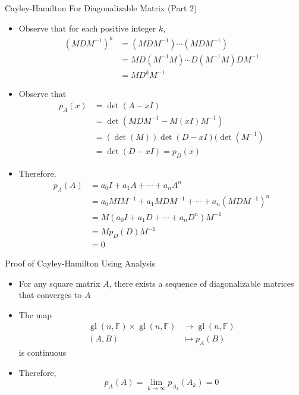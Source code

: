 \documentclass[usenames,dvipsnames,10pt]{beamer}
\newcommand\F{\mathbb{F}}
\newcommand{\gl}{\operatorname{gl}}
\begin{document}
\begin{frame}
  {Cayley-Hamilton For Diagonalizable Matrix (Part 2)}

  \begin{itemize}
  \item Observe that for each positive integer $k$,
    \begin{align*}
      (MDM^{-1})^k &= (MDM^{-1})\cdots (MDM^{-1})\\
                   &= MD(M^{-1}M)\cdots D(M^{-1}M)DM^{-1}\\
                   &= MD^kM^{-1}
    \end{align*}
  \item Observe that
    \begin{align*}
      p_A(x) &= \det(A-xI)\\
             &= \det(MDM^{-1}-M(xI)M^{-1})\\
             &= (\det(M))\det(D-xI)(\det(M^{-1})\\
             &= \det(D-xI) = p_D(x)
    \end{align*}
  \item Therefore,
    \begin{align*}
      p_A(A) &= a_0I + a_1A + \cdots + a_nA^n\\
             &= a_0MIM^{-1} + a_1MDM^{-1}+\cdots + a_n(MDM^{-1})^n\\
             &= M(a_0I + a_1D + \cdots + a_nD^n)M^{-1}\\
             &= Mp_D(D)M^{-1}\\
             &= 0
    \end{align*}
  \end{itemize}
\end{frame}

\begin{frame}
  {Proof of Cayley-Hamilton Using Analysis}

  \begin{itemize}
  \item For any square matrix $A$, there exists a sequence of diagonalizable matrices that converges to $A$
  \item The map
    \begin{align*}
      \gl(n,\F)\times\gl(n,\F) &\rightarrow \gl(n,\F)\\
      (A,B) &\mapsto p_A(B)
    \end{align*}
    is continuous
  \item Therefore,
    \[
      p_A(A) = \lim_{k\rightarrow\infty} p_{A_k}(A_k) = 0
    \]
  \end{itemize}
\end{frame}
\end{document}
